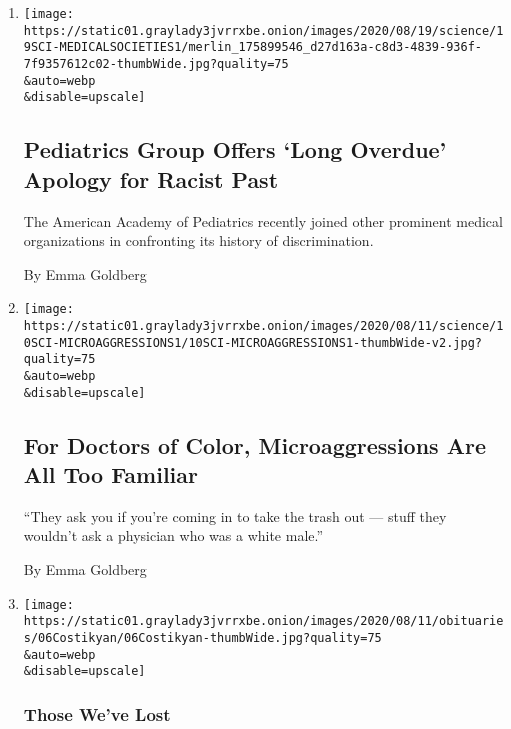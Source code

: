 \begin{enumerate}
\def\labelenumi{\arabic{enumi}.}
\item
  \href{/2020/08/20/health/pediatrics-medicine-racial-discrimination.html}{}

  \texttt{[image: https://static01.graylady3jvrrxbe.onion/images/2020/08/19/science/19SCI-MEDICALSOCIETIES1/merlin\_175899546\_d27d163a-c8d3-4839-936f-7f9357612c02-thumbWide.jpg?quality=75\\\&auto=webp\\\&disable=upscale]}

  \hypertarget{pediatrics-group-offers-long-overdue-apology-for-racist-past}{%
  \subsection{Pediatrics Group Offers `Long Overdue' Apology for Racist
  Past}\label{pediatrics-group-offers-long-overdue-apology-for-racist-past}}

  The American Academy of Pediatrics recently joined other prominent
  medical organizations in confronting its history of discrimination.

  By Emma Goldberg
\item
  \href{/2020/08/11/health/microaggression-medicine-doctors.html}{}

  \texttt{[image: https://static01.graylady3jvrrxbe.onion/images/2020/08/11/science/10SCI-MICROAGGRESSIONS1/10SCI-MICROAGGRESSIONS1-thumbWide-v2.jpg?quality=75\\\&auto=webp\\\&disable=upscale]}

  \hypertarget{for-doctors-of-color-microaggressions-are-all-too-familiar}{%
  \subsection{For Doctors of Color, Microaggressions Are All Too
  Familiar}\label{for-doctors-of-color-microaggressions-are-all-too-familiar}}

  ``They ask you if you're coming in to take the trash out --- stuff
  they wouldn't ask a physician who was a white male.''

  By Emma Goldberg
\item
  \href{/2020/08/07/obituaries/barbara-costikyan-dead-coronavirus.html}{}

  \texttt{[image: https://static01.graylady3jvrrxbe.onion/images/2020/08/11/obituaries/06Costikyan/06Costikyan-thumbWide.jpg?quality=75\\\&auto=webp\\\&disable=upscale]}

  \hypertarget{those-weve-lost}{%
  \subsubsection{Those We've Lost}\label{those-weve-lost}}


\end{enumerate}
